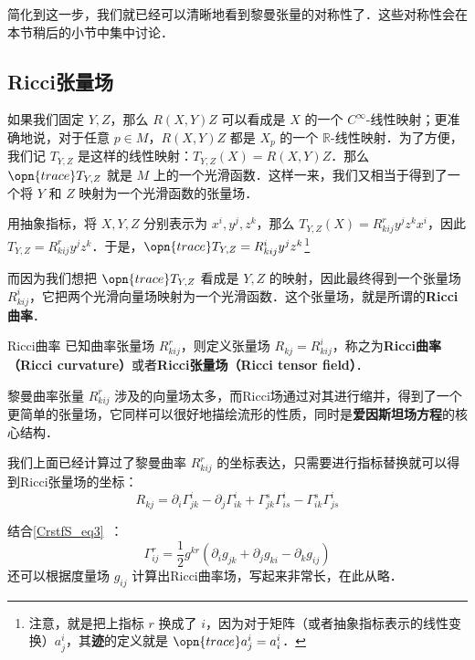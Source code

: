 简化到这一步，我们就已经可以清晰地看到黎曼张量的对称性了．这些对称性会在本节稍后的小节中集中讨论．











\subsection{Ricci张量场}

如果我们固定 $Y, Z$，那么 $R(X, Y)Z$ 可以看成是 $X$ 的一个 $C^{\infty}$-线性映射；更准确地说，对于任意 $p\in M$，$R(X, Y)Z$ 都是 $X_p$ 的一个 $\mathbb{R}$-线性映射．为了方便，我们记 $T_{Y, Z}$ 是这样的线性映射：$T_{Y, Z}(X)=R(X, Y)Z$．那么 $\opn{trace}T_{Y, Z}$ 就是 $M$ 上的一个光滑函数．这样一来，我们又相当于得到了一个将 $Y$ 和 $Z$ 映射为一个光滑函数的张量场．

用抽象指标，将 $X, Y, Z$ 分别表示为 $x^i, y^j, z^k$，那么 $T_{Y, Z}(X)=R^r_{kij}y^jz^kx^i$，因此 $T_{Y, Z}=R^r_{kij}y^jz^k$．于是，$\opn{trace}T_{Y, Z}=R^i_{kij}y^jz^k$\footnote{注意，就是把上指标 $r$ 换成了 $i$，因为对于矩阵（或者抽象指标表示的线性变换）$a^i_j$，其\textbf{迹}的定义就是 $\opn{trace}a^i_j=a^i_i$．}

而因为我们想把 $\opn{trace}T_{Y, Z}$ 看成是 $Y, Z$ 的映射，因此最终得到一个张量场 $R^i_{kij}$，它把两个光滑向量场映射为一个光滑函数．这个张量场，就是所谓的\textbf{Ricci曲率}．

\begin{definition}{Ricci曲率}
已知曲率张量场 $R^r_{kij}$，则定义张量场 $R_{kj}=R^i_{kij}$，称之为\textbf{Ricci曲率（Ricci curvature）}或者\textbf{Ricci张量场（Ricci tensor field）}．
\end{definition}

黎曼曲率张量 $R^r_{kij}$ 涉及的向量场太多，而Ricci场通过对其进行缩并，得到了一个更简单的张量场，它同样可以很好地描绘流形的性质，同时是\textbf{爱因斯坦场方程}的核心结构．

我们上面已经计算过了黎曼曲率 $R^r_{kij}$ 的坐标表达，只需要进行指标替换就可以得到Ricci张量场的坐标：
\begin{equation}\label{RicciC_eq9}
R_{kj}=\partial_i\Gamma^i_{jk}-\partial_j\Gamma^{i}_{ik}+\Gamma^s_{jk}\Gamma^i_{is}-\Gamma^s_{ik}\Gamma^i_{js}
\end{equation}

结合\autoref{CrstfS_eq3}~：
\begin{equation}
\Gamma^{r}_{ij}=\frac{1}{2}g^{kr}(\partial_ig_{jk}+\partial_jg_{ki}-\partial_kg_{ij})
\end{equation}
还可以根据度量场 $g_{ij}$ 计算出Ricci曲率场，写起来非常长，在此从略．





